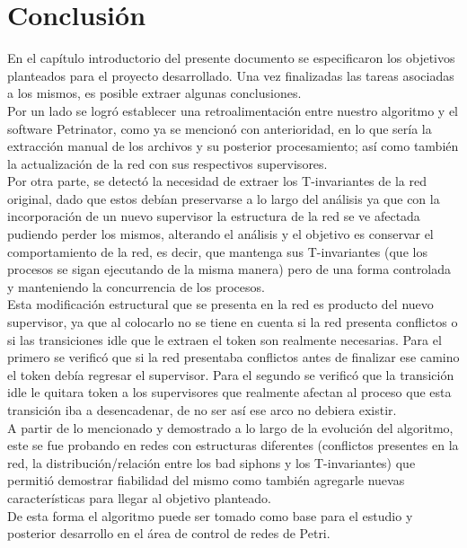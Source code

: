 
\chapter{Conclusión} %

\label{Chapter7} %
En el capítulo introductorio del presente documento se especificaron los objetivos planteados para el proyecto desarrollado. Una vez finalizadas las tareas asociadas a los mismos, es posible extraer algunas conclusiones. \\

Por un lado se logró establecer una retroalimentación entre nuestro algoritmo y el software Petrinator, como ya se mencionó con anterioridad, en lo que sería la extracción manual de los archivos y su posterior procesamiento; así como también la actualización de la red con sus respectivos supervisores. \\

Por otra parte, se detectó la necesidad de extraer los T-invariantes de la red original, dado que estos debían preservarse a lo largo del análisis ya que con la incorporación de un nuevo supervisor la estructura de la red se ve afectada pudiendo perder los mismos, alterando el análisis y el objetivo es conservar el comportamiento de la red, es decir, que mantenga sus T-invariantes (que los procesos se sigan ejecutando de la misma manera) pero de una forma controlada y manteniendo la concurrencia de los procesos. \\
Esta modificación estructural que se presenta en la red es producto del nuevo supervisor, ya que al colocarlo no se tiene en cuenta si la red presenta conflictos o si las transiciones idle que le extraen el token son realmente necesarias. Para el primero se verificó que si la red presentaba conflictos antes de finalizar ese camino el token debía regresar el supervisor. Para el segundo se verificó que la transición idle le quitara token a los supervisores que realmente afectan al proceso que esta transición iba a desencadenar, de no ser así ese arco no debiera existir. \\

A partir de lo mencionado y demostrado a lo largo de la evolución del algoritmo, este se fue probando en redes con estructuras diferentes (conflictos presentes en la red, la distribución/relación entre los bad siphons y los T-invariantes) que permitió demostrar fiabilidad del mismo como también agregarle nuevas características para llegar al objetivo planteado. \\
De esta forma el algoritmo puede ser tomado como base para el estudio y posterior desarrollo en el área de control de redes de Petri.

